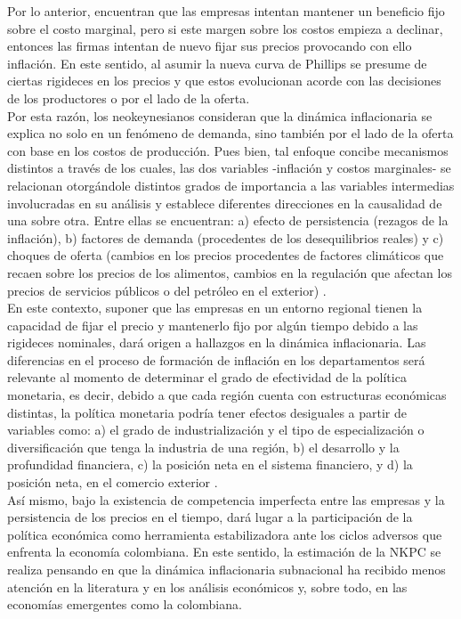 Por lo anterior, \cite{gali1999inflation} encuentran que las empresas intentan mantener un beneficio fijo sobre el costo marginal, pero si este margen sobre los costos empieza a declinar, entonces las firmas intentan de nuevo fijar sus precios provocando con ello inflación. En este sentido, al asumir la nueva curva de Phillips se presume de ciertas rigideces en los precios y que estos evolucionan acorde con las decisiones de los productores o por el lado de la oferta.\\

Por esta razón, los neokeynesianos consideran que la dinámica inflacionaria se explica no solo en un fenómeno de demanda, sino también por el lado de la oferta con base en los costos de producción. Pues bien, tal enfoque concibe mecanismos distintos a través de los cuales, las dos variables -inflación y costos marginales- se relacionan otorgándole distintos grados de importancia a las variables intermedias involucradas en su análisis y establece diferentes direcciones en la causalidad de una sobre otra. Entre ellas se encuentran: a) efecto de persistencia (rezagos de la inflación), b) factores de demanda (procedentes de los desequilibrios reales) y c) choques de oferta (cambios en los precios procedentes de factores climáticos que recaen sobre los precios de los alimentos, cambios en la regulación que afectan los precios de servicios públicos o del petróleo en el exterior) \citep{gordon1997time}. \\

En este contexto, suponer que las empresas en un entorno regional  tienen la capacidad de fijar el precio y mantenerlo fijo por algún tiempo debido a las rigideces nominales, dará origen a hallazgos en la dinámica inflacionaria.  Las diferencias en el proceso de formación de inflación en los departamentos  será relevante al momento de determinar el grado de  efectividad de la política monetaria, es decir, debido a que cada región cuenta con estructuras económicas distintas, la política monetaria podría tener efectos desiguales a partir de  variables como:   a) el grado de industrialización y el tipo de especialización o diversificación que tenga la industria de una región, b) el desarrollo y la profundidad financiera, c) la posición neta en el sistema financiero, y d) la posición neta, en el comercio exterior  \citep{romero2008transmision}. \\

Así mismo, bajo la existencia de competencia imperfecta entre las empresas y la persistencia de los precios en el tiempo, dará lugar a la participación de la política económica como herramienta estabilizadora ante los ciclos adversos que enfrenta la economía colombiana. En este sentido, la estimación de la NKPC se realiza pensando en que la dinámica inflacionaria subnacional ha recibido menos atención en la literatura y en los análisis económicos y, sobre todo, en las economías emergentes como la colombiana.\\

